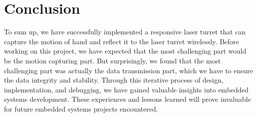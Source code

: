 \documentclass[12pt, a4paper]{article}
\begin{document}
\section{Conclusion}
To sum up, we have successfully implemented a responsive laser turret that can capture the motion of hand and reflect it to the laser turret wirelessly.
\newline
Before working on this project, we have expected that the most challenging part would be the motion capturing part. 
But surprisingly, we found that the most challenging part was actually the data transmission part, which we have to ensure the data integrity and stability.
Through this iterative process of design, implementation, and debugging, we have gained valuable insights into embedded systems development. 
These experiences and lessons learned will prove invaluable for future embedded systems projects encountered.
\end{document}
